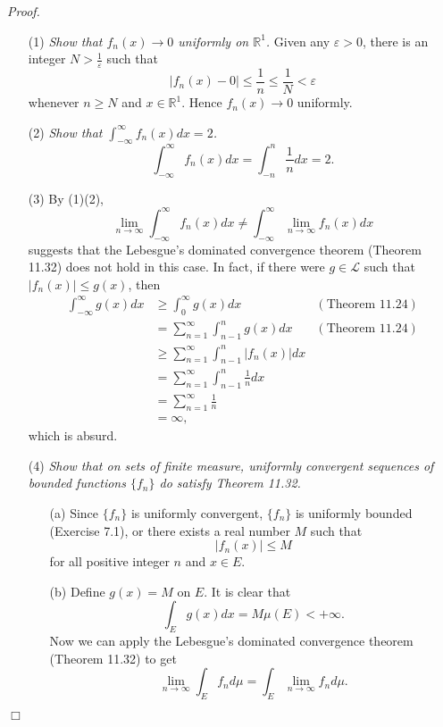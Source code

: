 \documentclass{article}
\begin{document}
\emph{Proof.}
\begin{enumerate}
\item[(1)]
  \emph{Show that $f_n(x) \to 0$ uniformly on $\mathbb{R}^1$.}
  Given any $\varepsilon > 0$, there is an integer $N > \frac{1}{\varepsilon}$
  such that
  \[
    |f_n(x) - 0| \leq \frac{1}{n} \leq \frac{1}{N} < \varepsilon
  \]
  whenever $n \geq N$ and $x \in \mathbb{R}^1$.
  Hence $f_n(x) \to 0$ uniformly.

\item[(2)]
  \emph{Show that $\int_{-\infty}^{\infty} f_n(x) dx = 2$.}
  \[
    \int_{-\infty}^{\infty} f_n(x) dx
    = \int_{-n}^{n} \frac{1}{n} dx
    = 2.
  \]

\item[(3)]
  By (1)(2),
  \[
    \lim_{n \to \infty} \int_{-\infty}^{\infty} f_n(x) dx
    \neq \int_{-\infty}^{\infty} \lim_{n \to \infty} f_n(x) dx
  \]
  suggests that the Lebesgue's dominated convergence theorem (Theorem 11.32)
  does not hold in this case.
  In fact,
  if there were $g \in \mathscr{L}$ such that $|f_n(x)| \leq g(x)$,
  then
  \begin{align*}
    \int_{-\infty}^{\infty} g(x) dx
    &\geq \int_{0}^{\infty} g(x) dx
      &(\text{Theorem 11.24}) \\
    &= \sum_{n=1}^{\infty} \int_{n-1}^{n} g(x) dx
      &(\text{Theorem 11.24}) \\
    &\geq \sum_{n=1}^{\infty} \int_{n-1}^{n} |f_n(x)| dx \\
    &= \sum_{n=1}^{\infty} \int_{n-1}^{n} \frac{1}{n} dx \\
    &= \sum_{n=1}^{\infty} \frac{1}{n} \\
    &= \infty,
  \end{align*}
  which is absurd.

\item[(4)]
  \emph{Show that on sets of finite measure,
  uniformly convergent sequences of bounded functions $\{f_n\}$
  do satisfy Theorem 11.32.}
  \begin{enumerate}
  \item[(a)]
    Since $\{f_n\}$ is uniformly convergent,
    $\{f_n\}$ is uniformly bounded (Exercise 7.1), or
    there exists a real number $M$ such that
    \[
      |f_n(x)| \leq M
    \]
    for all positive integer $n$ and $x \in E$.

  \item[(b)]
    Define $g(x) = M$ on $E$.
    It is clear that
    \[
      \int_E g(x) dx = M \mu(E) < +\infty.
    \]
    Now we can apply the Lebesgue's dominated convergence theorem (Theorem 11.32)
    to get
    \[
      \lim_{n \to \infty} \int_E f_n d\mu = \int_E \lim_{n \to \infty} f_n d\mu.
    \]
  \end{enumerate}
\end{enumerate}
$\Box$ \\\\
\end{document}
